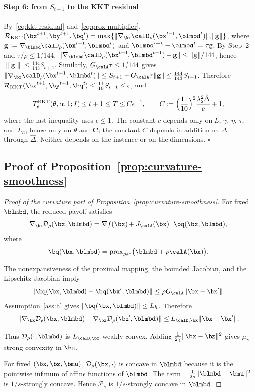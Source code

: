 \paragraph{Step 6: from \(S_{t+1}\) to the KKT residual}
By~\eqref{eq:kkt-residual} and~\eqref{eq:prox-multiplier},
\(\mathcal R_{\mathrm{KKT}}(\bx^{t+1},\by^{t+1},\bq^t)
=\max\{\|\nabla_{\bx}\calD_\rho(\bx^{t+1},\blmbd^t)\|,\|\mathbf g\|\}\), where
\(\mathbf g:=\nabla_{\blmbd}\calD_\rho(\bx^{t+1},\blmbd^t)\) and
\(\blmbd^{t+1}-\blmbd^t=\tau\mathbf g\). By Step~2 and \(\tau/\rho\le1/144\),
\(\|\nabla_{\blmbd}\calD_\rho(\bx^{t+1},\blmbd^{t+1})-\mathbf g\|\le\|\mathbf g\|/144\),
hence \(\|\mathbf g\|\le\frac{144}{143}S_{t+1}\). Similarly,
\(G_{\calA}\tau\le1/144\) gives
\(\|\nabla_{\bx}\calD_\rho(\bx^{t+1},\blmbd^t)\|
\le S_{t+1}+G_{\calA}\tau\|\mathbf g\|\le\frac{144}{143}S_{t+1}\). Therefore
\(\mathcal R_{\mathrm{KKT}}(\bx^{t+1},\by^{t+1},\bq^t)\le\frac{11}{10}S_{t+1}\le\epsilon\),
and
\[
T^{\mathrm{KKT}}_\epsilon(\theta,\alpha,1;I)\le t+1\le T\le C\epsilon^{-4},
\qquad
C:=\Bigl(\frac{11}{10}\Bigr)^2\frac{\lambda_2^2\hat\Delta}{c}+1,
\]
where the last inequality uses \(\epsilon\le1\). The constant \(c\) depends
only on \(L\), \(\gamma\), \(\eta\), \(\tau\), and \(L_h\), hence only on
\(\theta\) and \(\mathbf C\); the constant \(C\) depends in addition on
\(\Delta\) through \(\hat\Delta\). Neither depends on the instance or on the
dimensions.
\hfill\(\square\)

\subsection{Proof of Proposition~\ref{prop:curvature-smoothness}}
\label{app:curvature-smoothness}

\begin{proof}[Proof of the curvature part of Proposition~\ref{prop:curvature-smoothness}]
For fixed $\blmbd$, the reduced payoff satisfies
\[
    \nabla_{\bx}\mathcal D_\rho(\bx,\blmbd)
    =
    \nabla f(\bx)+J_{\calA}(\bx)^\top\bq(\bx,\blmbd),
\]
where
\[
    \bq(\bx,\blmbd)
    =
    \operatorname{prox}_{\rho h^*}
    \bigl(\blmbd+\rho\calA(\bx)\bigr).
\]

The nonexpansiveness of the proximal mapping, the bounded Jacobian, and
the Lipschitz Jacobian imply
\[
    \|\bq(\bx,\blmbd)-\bq(\bx',\blmbd)\|
    \le \rho G_{\calA}\|\bx-\bx'\|.
\]
Assumption~\ref{ass:h} gives
\(\|\bq(\bx,\blmbd)\|\le L_h\).  Therefore
\[
    \|\nabla_{\bx}\mathcal D_\rho(\bx,\blmbd)
    -\nabla_{\bx}\mathcal D_\rho(\bx',\blmbd)\|
    \le L_{\calD,\bx}\|\bx-\bx'\|.
\]

Thus $\mathcal D_\rho(\cdot,\blmbd)$ is
$L_{\calD,\bx}$-weakly convex.  Adding
$\frac{1}{2\gamma}\|\bx-\bz\|^2$ gives
$\mu_\gamma$-strong convexity in $\bx$.

For fixed $(\bx,\bz,\bmu)$, $\mathcal D_\rho(\bx,\cdot)$ is concave in
$\blmbd$ because it is the pointwise infimum of affine functions of
$\blmbd$.  The term
$-\frac{1}{2s}\|\blmbd-\bmu\|^2$ is $1/s$-strongly concave.  Hence
$\mathcal P_s$ is $1/s$-strongly concave in $\blmbd$.
\end{proof}

